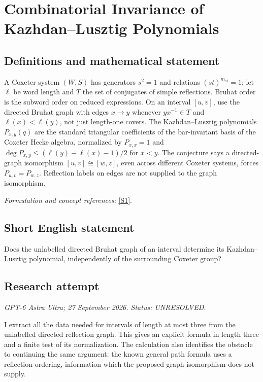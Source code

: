 \documentclass[11pt]{article}
\begin{document}
\section*{\texorpdfstring{Combinatorial Invariance of Kazhdan–Lusztig Polynomials}{Combinatorial Invariance of Kazhdan–Lusztig Polynomials}}\label{30004890}
\subsection{Definitions and mathematical statement}
A Coxeter system $(W,S)$ has generators $s^2=1$ and relations $(st)^{m_{st}}=1$; let $\ell$ be word length and $T$ the set of conjugates of simple reflections. Bruhat order is the subword order on reduced expressions. On an interval $[u,v]$, use the directed Bruhat graph with edges $x\to y$ whenever $yx^{-1}\in T$ and $\ell(x)<\ell(y)$, not just length-one covers. The Kazhdan--Lusztig polynomials $P_{x,y}(q)$ are the standard triangular coefficients of the bar-invariant basis of the Coxeter Hecke algebra, normalized by $P_{x,x}=1$ and $\deg P_{x,y}\le(\ell(y)-\ell(x)-1)/2$ for $x<y$. The conjecture says a directed-graph isomorphism $[u,v]\cong[w,z]$, even across different Coxeter systems, forces $P_{u,v}=P_{w,z}$. Reflection labels on edges are not supplied to the graph isomorphism.
\par\smallskip\textit{Formulation and concept references:} \href{https://link.springer.com/article/10.1007/s00029-024-00972-0}{[S1]}.

\subsection{Short English statement}
Does the unlabelled directed Bruhat graph of an interval determine its Kazhdan--Lusztig polynomial, independently of the surrounding Coxeter group?
\subsection{Research attempt}
\textit{GPT-6 Astra Ultra; 27 September 2026. Status: UNRESOLVED.}

I extract all the data needed for intervals of length at most three
from the unlabelled directed reflection graph. This gives an explicit
formula in length three and a finite test of its normalization. The
calculation also identifies the obstacle to continuing the same argument:
the known general path formula uses a reflection ordering, information
which the proposed graph isomorphism does not supply.
\end{document}
